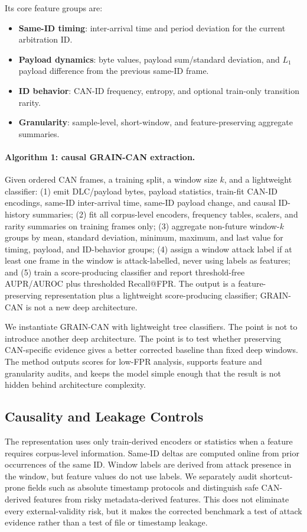 \documentclass[runningheads]{llncs}
\newcommand{\method}{GRAIN-CAN}
\begin{document}
Its core feature groups are:
\begin{itemize}
    \item \textbf{Same-ID timing}: inter-arrival time and period deviation for the current arbitration ID.
    \item \textbf{Payload dynamics}: byte values, payload sum/standard deviation, and $L_1$ payload difference from the previous same-ID frame.
    \item \textbf{ID behavior}: CAN-ID frequency, entropy, and optional train-only transition rarity.
    \item \textbf{Granularity}: sample-level, short-window, and feature-preserving aggregate summaries.
\end{itemize}


\paragraph{Algorithm 1: causal GRAIN-CAN extraction.}
Given ordered CAN frames, a training split, a window size $k$, and a lightweight classifier:
(1) emit DLC/payload bytes, payload statistics, train-fit CAN-ID encodings, same-ID inter-arrival time, same-ID payload change, and causal ID-history summaries;
(2) fit all corpus-level encoders, frequency tables, scalers, and rarity summaries on training frames only;
(3) aggregate non-future window-$k$ groups by mean, standard deviation, minimum, maximum, and last value for timing, payload, and ID-behavior groups;
(4) assign a window attack label if at least one frame in the window is attack-labelled, never using labels as features; and
(5) train a score-producing classifier and report threshold-free AUPR/AUROC plus thresholded Recall@FPR.
The output is a feature-preserving representation plus a lightweight score-producing classifier; \method{} is not a new deep architecture.

We instantiate \method{} with lightweight tree classifiers.  The point is not to introduce another deep architecture.  The point is to test whether preserving CAN-specific evidence gives a better corrected baseline than fixed deep windows.  The method outputs scores for low-FPR analysis, supports feature and granularity audits, and keeps the model simple enough that the result is not hidden behind architecture complexity.

\subsection{Causality and Leakage Controls}
The representation uses only train-derived encoders or statistics when a feature requires corpus-level information.  Same-ID deltas are computed online from prior occurrences of the same ID.  Window labels are derived from attack presence in the window, but feature values do not use labels.  We separately audit shortcut-prone fields such as absolute timestamp protocols and distinguish safe CAN-derived features from risky metadata-derived features.  This does not eliminate every external-validity risk, but it makes the corrected benchmark a test of attack evidence rather than a test of file or timestamp leakage.
\end{document}
